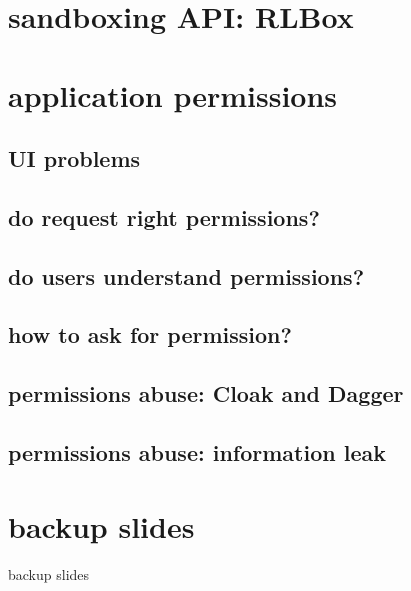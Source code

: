 \section{sandboxing API: RLBox}


\section{application permissions}


\subsection{UI problems}


\subsection{do request right permissions?}


\subsection{do users understand permissions?}


\subsection{how to ask for permission?}


\subsection{permissions abuse: Cloak and Dagger}


\subsection{permissions abuse: information leak}



\section{backup slides}
\begin{frame}{backup slides}
\end{frame}


